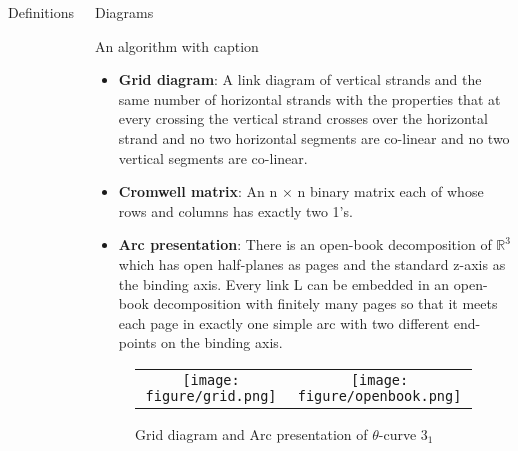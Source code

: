 \documentclass[final]{beamer}
\begin{document}
\begin{frame}[t]
\begin{columns}[t]
\begin{block}{Definitions}
    
  \end{block}
  \begin{block}{Diagrams}

    \begin{Diagrams}
      \caption{An algorithm with caption}\label{alg:cap}
      \begin{itemize} 
        \item \textbf{Grid diagram}: A link diagram of vertical strands and the same number of horizontal strands with the properties that at every crossing the vertical strand crosses over the horizontal strand and no two horizontal segments are co-linear and no two vertical segments are co-linear.
        \item \textbf{Cromwell matrix}: An n × n binary matrix each of whose rows and columns has exactly two 1’s.
        \item \textbf{Arc presentation}: There is an open-book decomposition of $\mathbb{R}^3$ which has open half-planes as pages and the standard z-axis as the binding axis.
        Every link L can be embedded in an open-book decomposition with finitely many pages so that it meets each page in exactly one simple arc with two different end-points on the binding axis.
      \end{itemize}

      \begin{figure}[h]
        \centering
        \begin{tabular}{cc}
          \texttt{[image: figure/grid.png]} &
          \texttt{[image: figure/openbook.png]} \\
        \end{tabular}
        \caption{Grid diagram and Arc presentation of $\theta$-curve $3_1$}
      \end{figure}
    \end{Diagrams}

    

  

  
  \end{block}

  


\end{columns}
\end{frame}
\end{document}
